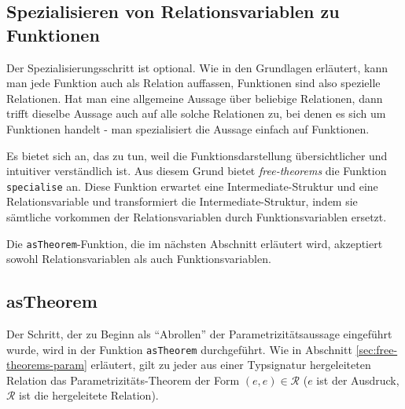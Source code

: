 \subsection{Spezialisieren von Relationsvariablen zu Funktionen}

Der Spezialisierungsschritt ist optional. Wie in den Grundlagen erläutert, kann man jede Funktion auch als Relation auffassen,
Funktionen sind also spezielle Relationen. Hat man eine allgemeine Aussage über beliebige Relationen, dann trifft dieselbe
Aussage auch auf alle solche Relationen zu, bei denen es sich um Funktionen handelt - man spezialisiert die Aussage einfach
auf Funktionen.

Es bietet sich an, das zu tun, weil die Funktionsdarstellung übersichtlicher und intuitiver verständlich ist. Aus diesem Grund
bietet \textit{free-theorems} die Funktion \texttt{specialise} an. Diese Funktion erwartet eine Intermediate-Struktur und
eine Relationsvariable und transformiert die Intermediate-Struktur, indem sie sämtliche vorkommen der Relationsvariablen
durch Funktionsvariablen ersetzt.

Die \texttt{asTheorem}-Funktion, die im nächsten Abschnitt erläutert wird, akzeptiert sowohl Relationsvariablen als auch
Funktionsvariablen.



\subsection{asTheorem}

Der Schritt, der zu Beginn als ``Abrollen'' der Parametrizitätsaussage eingeführt wurde, wird in der Funktion \texttt{asTheorem}
durchgeführt. Wie in Abschnitt \ref{sec:free-theorems-param} erläutert, gilt zu jeder aus einer Typsignatur hergeleiteten
Relation das Parametrizitäts-Theorem der Form $(e, e) \in \mathcal{R}$ ($e$ ist der Ausdruck, $\mathcal{R}$ ist die hergeleitete
Relation).

